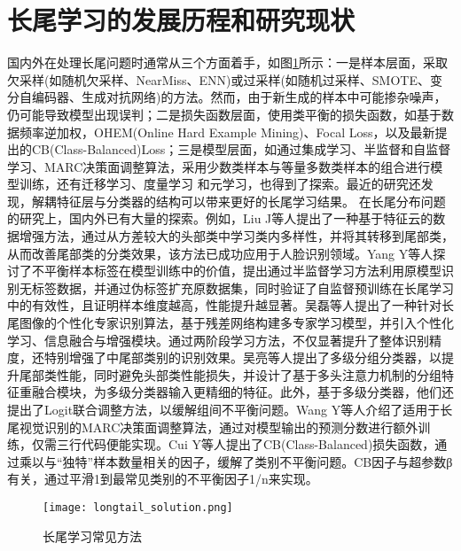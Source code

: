 \documentclass[master]{thesis-uestc}
\begin{document}
\section{长尾学习的发展历程和研究现状}
国内外在处理长尾问题时通常从三个方面着手，如图\ref{longtail_solution}所示：一是样本层面，采取欠采样(如随机欠采样、NearMiss、ENN)或过采样(如随机过采样、SMOTE、变分自编码器、生成对抗网络)的方法。然而，由于新生成的样本中可能掺杂噪声，仍可能导致模型出现误判；二是损失函数层面，使用类平衡的损失函数，如基于数据频率逆加权，OHEM(Online Hard Example Mining)、Focal Loss，以及最新提出的CB(Class-Balanced)Loss；三是模型层面，如通过集成学习、半监督和自监督学习、MARC决策面调整算法，采用少数类样本与等量多数类样本的组合进行模型训练，还有迁移学习、度量学习 和元学习，也得到了探索。最近的研究还发现，解耦特征层与分类器的结构可以带来更好的长尾学习结果。
在长尾分布问题的研究上，国内外已有大量的探索。例如，Liu J等人提出了一种基于特征云的数据增强方法，通过从方差较大的头部类中学习类内多样性，并将其转移到尾部类，从而改善尾部类的分类效果，该方法已成功应用于人脸识别领域。Yang Y等人探讨了不平衡样本标签在模型训练中的价值，提出通过半监督学习方法利用原模型识别无标签数据，并通过伪标签扩充原数据集，同时验证了自监督预训练在长尾学习中的有效性，且证明样本维度越高，性能提升越显著。吴磊等人提出了一种针对长尾图像的个性化专家识别算法，基于残差网络构建多专家学习模型，并引入个性化学习、信息融合与增强模块。通过两阶段学习方法，不仅显著提升了整体识别精度，还特别增强了中尾部类别的识别效果。吴亮等人提出了多级分组分类器，以提升尾部类性能，同时避免头部类性能损失，并设计了基于多头注意力机制的分组特征重融合模块，为多级分类器输入更精细的特征。此外，基于多级分类器，他们还提出了Logit联合调整方法，以缓解组间不平衡问题。Wang Y等人介绍了适用于长尾视觉识别的MARC决策面调整算法，通过对模型输出的预测分数进行额外训练，仅需三行代码便能实现。Cui Y等人提出了CB(Class-Balanced)损失函数，通过乘以与“独特”样本数量相关的因子，缓解了类别不平衡问题。CB因子与超参数β有关，通过平滑1到最常见类别的不平衡因子1/n来实现。

\begin{figure}[h]
    \texttt{[image: longtail\_solution.png]}
    \caption{长尾学习常见方法}
    \label{longtail_solution}
\end{figure}
\end{document}
